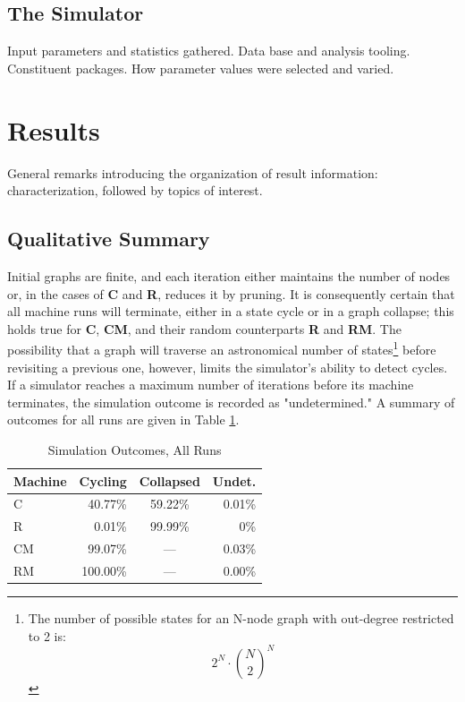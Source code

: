 \documentclass{tufte-handout}
\begin{document}
\subsection{The Simulator}

Input parameters and statistics gathered. Data base and analysis tooling.
Constituent packages. How parameter values were selected and varied.


\section{Results}

General remarks introducing the organization of result information: characterization,
followed by topics of interest.

\subsection{Qualitative Summary}

Initial graphs are finite, and each iteration
either maintains the number of nodes or, in the cases of \textbf{C} and \textbf{R},
reduces it by pruning.  It is consequently certain that all machine runs will terminate,
either in a state cycle or in a graph collapse; this holds true
for \textbf{C}, \textbf{CM}, and their random counterparts \textbf{R} and \textbf{RM}.
The possibility that a graph will traverse an astronomical number
of states\footnote{The number of possible states for an N-node graph with
out-degree restricted to 2 is:
\[
2^N\cdot\binom{N}{2}^N
\]
}
before revisiting a previous one, however, limits the simulator's ability to
detect cycles. If a simulator reaches a maximum number of iterations
before its machine terminates, the simulation outcome is recorded as "undetermined."
A summary of outcomes for all runs are given in Table \ref{tab:Tab1}.

\begin{table}
\caption{Simulation Outcomes, All Runs}
\centering
\begin{tabular}{lrcr}
\toprule
Machine & Cycling & Collapsed & Undet. \\
\midrule
C & 40.77\% & 59.22\% & 0.01\% \\
R & 0.01\% & 99.99\% & 0\% \\
\cmidrule(r){2-3}
CM & 99.07\% & --- & 0.03\% \\
RM & 100.00\% & --- & 0.00\% \\
\bottomrule
\end{tabular}
\label{tab:Tab1}
\end{table}
\vspace{3mm}
\end{document}
